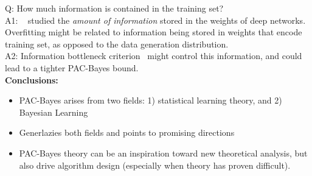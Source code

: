 Q: How much information is contained in the training set? \\

A1: ~\citet{achille2018information} studied the {\it amount of information} stored in the weights of deep networks. Overfitting might be related to information being stored in weights that encode training set, as opposed to the data generation distribution. \\

A2: Information bottleneck criterion~\cite{} might control this information, and could lead to a tighter PAC-Bayes bound. \\

{\bf Conclusions:}
\begin{itemize}
    \item PAC-Bayes arises from two fields: 1) statistical learning theory, and 2) Bayesian Learning
    \item Generlazies both fields and points to promising directions
    \item PAC-Bayes theory can be an inspiration toward new theoretical analysis, but also drive algorithm design (especially when theory has proven difficult).
\end{itemize}